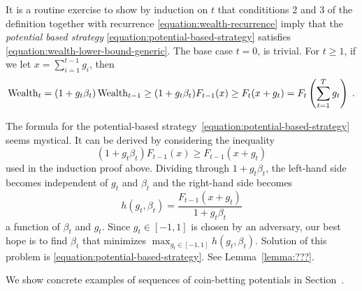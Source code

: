 It is a routine exercise to show by induction on $t$ that condititions 2 and 3
of the definition together with recurrence \eqref{equation:wealth-recurrence}
imply that the \emph{potential based strategy}
\eqref{equation:potential-based-strategy} satisfies
\eqref{equation:wealth-lower-bound-generic}. The base case $t=0$, is trivial.
For $t \ge 1$, if we let $x = \sum_{i=1}^{t-1} g_i$, then
$$
\operatorname{Wealth}_t
= (1+g_t \beta_t) \operatorname{Wealth}_{t-1}
\ge (1 + g_t \beta_t) F_{t-1}(x)
\ge F_t(x + g_t)
= F_t \left( \sum_{t=1}^T g_t \right) \; .
$$

The formula for the potential-based
strategy~\eqref{equation:potential-based-strategy} seems mystical. It
can be derived by considering the inequality
$$
(1+g_t\beta_t) F_{t-1}(x) \ge F_{t-1}(x + g_t)
$$
used in the induction proof above. Dividing through $1+g_t\beta_t$, the left-hand
side becomes independent of $g_t$ and $\beta_t$ and the right-hand side becomes
$$
h(g_t, \beta_t) = \frac{F_{t-1}(x + g_t)}{1 + g_t\beta_t}
$$
a function of $\beta_t$ and $g_t$. Since $g_t \in [-1,1]$ is chosen by an
adversary, our best hope is to find $\beta_t$ that minimizes $\max_{g_t \in
[-1,1]} h(g_t,\beta_t)$. Solution of this problem is \eqref{equation:potential-based-strategy}.
See Lemma~\ref{lemma:???}.


We show concrete examples of sequences of coin-betting potentials in
Section~\label{section:kt-estimator}.
